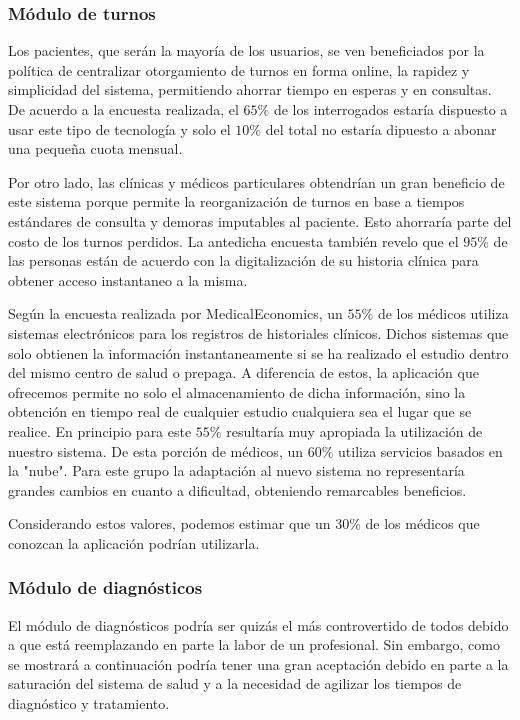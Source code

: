 \documentclass[a4paper,10pt]{article}
\begin{document}
\subsubsection{Módulo de turnos}

Los pacientes, que serán la mayoría de los usuarios, se ven beneficiados por la política de centralizar otorgamiento de turnos en forma online, la rapidez y simplicidad del sistema, permitiendo ahorrar tiempo en esperas y en consultas. De acuerdo a la encuesta realizada, el $65\%$ de los interrogados estaría dispuesto a usar este tipo de tecnología y solo el $10\%$ del total no estaría dipuesto a abonar una pequeña cuota mensual. 

Por otro lado, las clínicas y médicos particulares obtendrían un gran beneficio de este sistema porque permite la reorganización de turnos en base a tiempos estándares de consulta y demoras imputables al paciente. Esto ahorraría parte del costo de los turnos perdidos. La antedicha encuesta también revelo que el $95\%$ de las personas están de acuerdo con la digitalización de su historia clínica para obtener acceso instantaneo a la misma.

Según la encuesta realizada por MedicalEconomics, un $55\%$ de los médicos utiliza sistemas electrónicos para los registros de historiales clínicos. Dichos sistemas que solo obtienen la información instantaneamente si se ha realizado el estudio dentro del mismo centro de salud o prepaga. A diferencia de estos, la aplicación que ofrecemos permite no solo el almacenamiento de dicha información, sino la obtención  en tiempo real de cualquier estudio cualquiera sea el lugar que se realice. En principio para este $55\%$ resultaría muy apropiada la utilización de nuestro sistema. De esta porción de médicos, un $60\%$ utiliza servicios basados en la "nube". Para este grupo la adaptación al nuevo sistema no representaría grandes cambios en cuanto a dificultad, obteniendo remarcables beneficios.

Considerando estos valores, podemos estimar que un $30\%$ de los médicos que conozcan la aplicación podrían utilizarla. 

\subsubsection{Módulo de diagnósticos}

El módulo de diagnósticos podría ser quizás el más controvertido de todos debido a que está reemplazando en parte la labor de un profesional. Sin embargo, como se mostrará a continuación podría tener una gran aceptación debido en parte a la saturación del sistema de salud y a la necesidad de agilizar los tiempos de diagnóstico y tratamiento.
\end{document}
